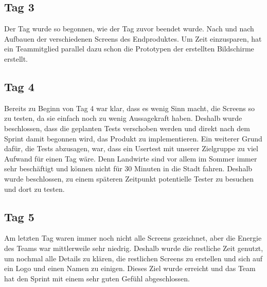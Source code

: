 \subsection{Tag 3}
Der Tag wurde so begonnen, wie der Tag zuvor beendet wurde. Nach und nach Aufbauen der verschiedenen Screens des Endproduktes. Um Zeit einzusparen, hat ein Teammitglied parallel dazu schon die Prototypen der erstellten Bildschirme erstellt.

\subsection{Tag 4}
Bereits zu Beginn von Tag 4 war klar, dass es wenig Sinn macht, die Screens so zu testen, da sie einfach noch zu wenig Aussagekraft haben. Deshalb wurde beschlossen, dass die geplanten Tests verschoben werden und direkt nach dem Sprint damit begonnen wird, das Produkt zu implementieren. Ein weiterer Grund dafür, die Tests abzusagen, war, dass ein Usertest mit unserer Zielgruppe zu viel Aufwand für einen Tag wäre. Denn Landwirte sind vor allem im Sommer immer sehr beschäftigt und können nicht für 30 Minuten in die Stadt fahren. Deshalb wurde beschlossen, zu einem späteren Zeitpunkt potentielle Tester zu besuchen und dort zu testen.

\subsection{Tag 5}
Am letzten Tag waren immer noch nicht alle Screens gezeichnet, aber die Energie des Teams war mittlerweile sehr niedrig. Deshalb wurde die restliche Zeit genutzt, um nochmal alle Details zu klären, die restlichen Screens zu erstellen und sich auf ein Logo und einen Namen zu einigen. Dieses Ziel wurde erreicht und das Team hat den Sprint mit einem sehr guten Gefühl abgeschlossen.

